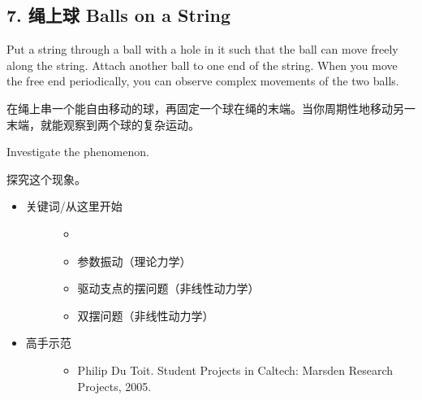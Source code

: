 \documentclass[a4paper,10pt,english]{sphinxmanual}
\begin{document}
\subsection{7. 绳上球 Balls on a String}
\label{\detokenize{7. Appendix:balls-on-a-string}}
Put a string through a ball with a hole in it such that the ball can move freely along the string. Attach another ball to one end of the string. When you move the free end periodically, you can observe complex movements of the two balls.

在绳上串一个能自由移动的球，再固定一个球在绳的末端。当你周期性地移动另一末端，就能观察到两个球的复杂运动。

Investigate the phenomenon.

探究这个现象。

\noindent{}
\begin{itemize}
\item {} \begin{description}
\item[{关键词/从这里开始}] \leavevmode\begin{itemize}
\item {} 

\item {} 
参数振动（理论力学）

\item {} 
驱动支点的摆问题（非线性动力学）

\item {} 
双摆问题（非线性动力学）

\end{itemize}

\end{description}

\item {} \begin{description}
\item[{高手示范}] \leavevmode\begin{itemize}
\item {} 
Philip Du Toit.  Student Projects in Caltech: Marsden Research Projects, 2005.

\end{itemize}

\end{description}


\end{itemize}
\end{document}
